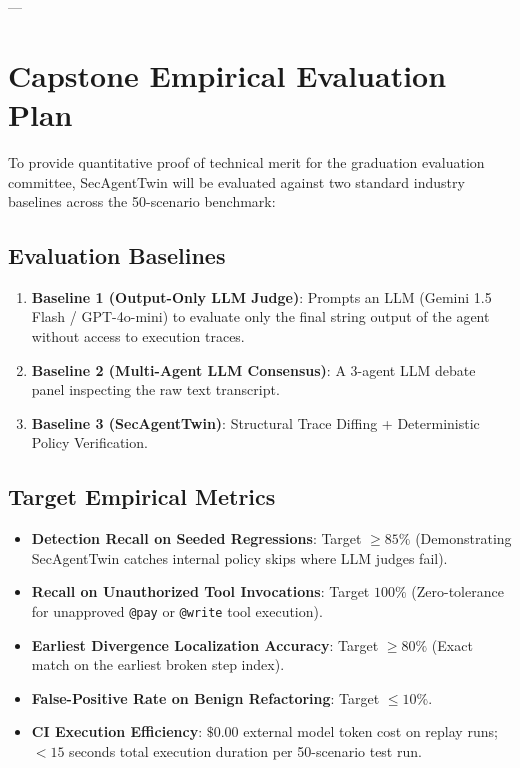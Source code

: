\documentclass[11pt,a4paper]{article}
\begin{document}
---

\section{Capstone Empirical Evaluation Plan}

To provide quantitative proof of technical merit for the graduation evaluation committee, SecAgentTwin will be evaluated against two standard industry baselines across the 50-scenario benchmark:

\subsection{Evaluation Baselines}
\begin{enumerate}[leftmargin=1.5em,noitemsep]
    \item \textbf{Baseline 1 (Output-Only LLM Judge)}: Prompts an LLM (Gemini 1.5 Flash / GPT-4o-mini) to evaluate only the final string output of the agent without access to execution traces.
    \item \textbf{Baseline 2 (Multi-Agent LLM Consensus)}: A 3-agent LLM debate panel inspecting the raw text transcript.
    \item \textbf{Baseline 3 (SecAgentTwin)}: Structural Trace Diffing + Deterministic Policy Verification.
\end{enumerate}

\subsection{Target Empirical Metrics}
\begin{itemize}[leftmargin=1.5em,noitemsep]
    \item \textbf{Detection Recall on Seeded Regressions}: Target $\ge 85\%$ (Demonstrating SecAgentTwin catches internal policy skips where LLM judges fail).
    \item \textbf{Recall on Unauthorized Tool Invocations}: Target $100\%$ (Zero-tolerance for unapproved \texttt{@pay} or \texttt{@write} tool execution).
    \item \textbf{Earliest Divergence Localization Accuracy}: Target $\ge 80\%$ (Exact match on the earliest broken step index).
    \item \textbf{False-Positive Rate on Benign Refactoring}: Target $\le 10\%$.
    \item \textbf{CI Execution Efficiency}: $\$0.00$ external model token cost on replay runs; $< 15$ seconds total execution duration per 50-scenario test run.
\end{itemize}
\end{document}

